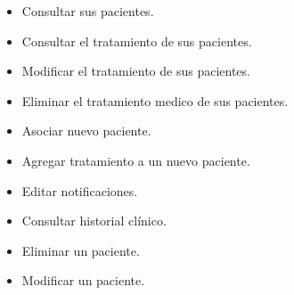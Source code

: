 \begin{itemize}
\begin{itemize}
			\item Consultar sus pacientes.
			\item Consultar el tratamiento de sus pacientes.
			\item Modificar el tratamiento de sus pacientes.
			\item Eliminar el tratamiento medico de sus pacientes.
			\item Asociar nuevo paciente.
			\item Agregar tratamiento a un nuevo paciente.
			\item Editar notificaciones.
			\item Consultar historial clínico.
			\item Eliminar un paciente.
			\item Modificar un paciente.
			
		\end{itemize}


\end{itemize}
